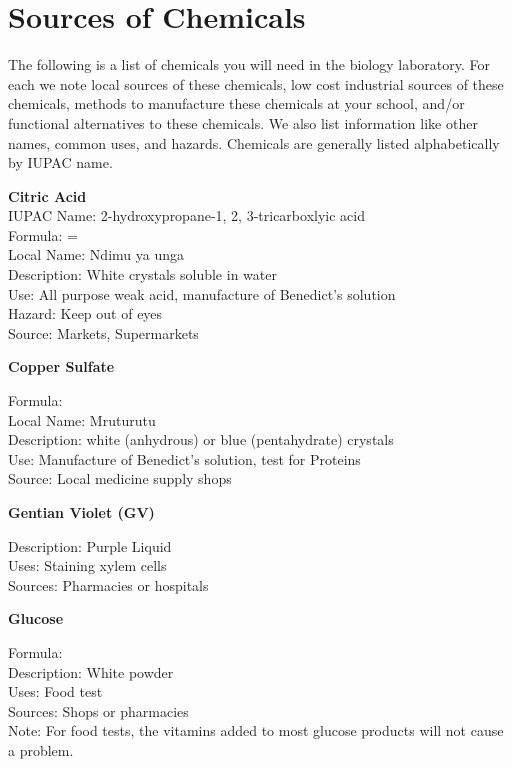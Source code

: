 \chapter{Sources of Chemicals}

The following is a list of chemicals you will need in the biology laboratory. For each we note local sources of these chemicals, low cost industrial sources of
these chemicals, methods to manufacture these chemicals at your school, and/or functional alternatives to these chemicals. We also list information like other names, common uses, and hazards. 
Chemicals are generally listed alphabetically by IUPAC name.

\begin{flushleft}
\textbf{Citric Acid}\\
IUPAC Name: 2-hydroxypropane-1, 2, 3-tricarboxlyic acid\\
Formula:  = \\
Local Name: Ndimu ya unga\\
Description: White crystals soluble in water\\
Use: All purpose weak acid, manufacture of Benedict's solution\\
Hazard: Keep out of eyes\\
Source: Markets, Supermarkets\\
\end{flushleft}


\begin{flushleft}
\textbf{Copper Sulfate}
\end{flushleft}
\vspace{-10pt}
Formula: \\
Local Name: Mruturutu\\
Description: white (anhydrous) or blue (pentahydrate) crystals\\
Use: Manufacture of Benedict's solution, test for Proteins\\
Source: Local medicine supply shops\\

\begin{flushleft}
\textbf{Gentian Violet (GV)}
\end{flushleft}
\vspace{-10pt}
Description: Purple Liquid\\
Uses: Staining xylem cells\\
Sources: Pharmacies or hospitals\\

\begin{flushleft}
\textbf{Glucose}
\end{flushleft}
\vspace{-10pt}
Formula: \\
Description: White powder\\
Uses: Food test\\
Sources: Shops or pharmacies\\
Note: For food tests, the vitamins added to most glucose products will not cause
a problem.


